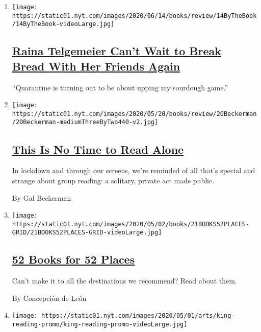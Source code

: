 \begin{enumerate}
\def\labelenumi{\arabic{enumi}.}
\item
  \texttt{[image: https://static01.nyt.com/images/2020/06/14/books/review/14ByTheBook/14ByTheBook-videoLarge.jpg]}

  \hypertarget{raina-telgemeier-cant-wait-to-break-bread-with-her-friends-again}{%
  \subsection{\texorpdfstring{\href{/2020/06/11/books/review/raina-telgemeier-by-the-book-interview.html}{Raina
  Telgemeier Can't Wait to Break Bread With Her Friends
  Again}}{Raina Telgemeier Can't Wait to Break Bread With Her Friends Again}}\label{raina-telgemeier-cant-wait-to-break-bread-with-her-friends-again}}

  ``Quarantine is turning out to be about upping my sourdough game.''
\item
  \texttt{[image: https://static01.nyt.com/images/2020/05/20/books/review/20Beckerman/20Beckerman-mediumThreeByTwo440-v2.jpg]}

  \hypertarget{this-is-no-time-to-read-alone}{%
  \subsection{\texorpdfstring{\href{/2020/05/20/books/virtual-reading-book-clubs-coronavirus.html}{This
  Is No Time to Read
  Alone}}{This Is No Time to Read Alone}}\label{this-is-no-time-to-read-alone}}

  In lockdown and through our screens, we're reminded of all that's
  special and strange about group reading: a solitary, private act made
  public.

  By Gal Beckerman
\item
  \texttt{[image: https://static01.nyt.com/images/2020/05/02/books/21BOOKS52PLACES-GRID/21BOOKS52PLACES-GRID-videoLarge.jpg]}

  \hypertarget{52-books-for-52-places}{%
  \subsection{\texorpdfstring{\href{/2020/02/28/books/travel-reading-52-books-for-52-places-2020.html}{52
  Books for 52
  Places}}{52 Books for 52 Places}}\label{52-books-for-52-places}}

  Can't make it to all the destinations we recommend? Read about them.

  By Concepción de León
\item
  \texttt{[image: https://static01.nyt.com/images/2020/05/01/arts/king-reading-promo/king-reading-promo-videoLarge.jpg]}


\end{enumerate}
